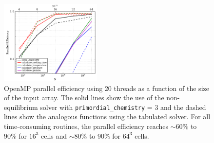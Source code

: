 \begin{figure}
  \centering
  \includegraphics[width=0.45\textwidth]{fig__openmp_performance.pdf}
  \caption{
    OpenMP parallel efficiency using 20 threads as a function of the size of
    the input array. The solid lines show the use of the
    non-equilibrium solver with \texttt{primordial\_chemistry} = 3 and
    the dashed lines show the analogous functions using the tabulated
    solver.  For all time-consuming
    routines, the parallel efficiency reaches $\sim$60\% to 90\% for
    $16^3$ cells and $\sim$80\% to 90\% for $64^3$ cells.
  } \label{fig:omp-perf}
\end{figure}

